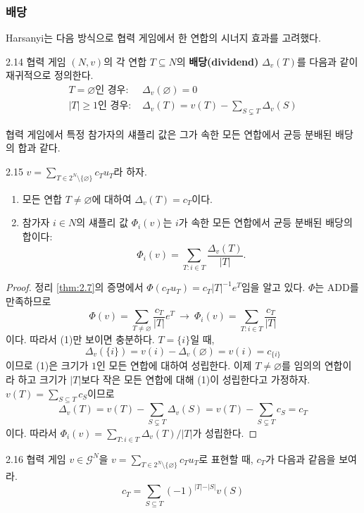 \documentclass{article}
\numberwithin{equation}{section}
\begin{document}
\subsubsection*{배당}
Harsanyi는 다음 방식으로 협력 게임에서 한 연합의 시너지 효과를 고려했다.

\begin{dfn}{}{2.14}
	 협력 게임 $(N,v)$의 각 연합 $T\subseteq N$의 \textbf{배당(dividend)} $\Delta_v(T)$를 다음과 같이 재귀적으로 정의한다.
	\[
		\begin{aligned}
			T=\varnothing\text{인 경우: }&\Delta_v(\varnothing)=0\\
			\vert T\vert\geq1\text{인 경우: }&\Delta_v(T)=v(T)-\sum_{S\subsetneq T}\Delta_v(S)
		\end{aligned}
	\]
\end{dfn}

협력 게임에서 특정 참가자의 섀플리 값은 그가 속한 모든 연합에서 균등 분배된 배당의 합과 같다.

\begin{thm}{}{2.15}
	$v=\sum_{T\in 2^N\setminus\{\varnothing\}}c_Tu_T$라 하자.
	\begin{enumerate}[(1)]
		\item 모든 연합 $T\ne\varnothing$에 대하여 $\Delta_v(T)=c_T$이다.
		\item 참가자 $i\in N$의 섀플리 값 $\Phi_i(v)$는 $i$가 속한 모든 연합에서 균등 분배된 배당의 합이다:
			\[
				\Phi_i(v)=\sum_{T:i\in T}\frac{\Delta_v(T)}{\vert T\vert}.
			\]
	\end{enumerate}
\end{thm}

\begin{proof}
	정리 \ref{thm:2.7}의 증명에서 $\Phi(c_Tu_T)=c_T\vert T\vert^{-1}e^T$임을 알고 있다. $\Phi$는 ADD를 만족하므로
	\[
		\Phi(v)=\sum_{T\ne\varnothing}\frac{c_T}{\vert T\vert}e^T~\longrightarrow~\Phi_i(v)=\sum_{T:i\in T}\frac{c_T}{\vert T\vert}
	\]
	이다. 따라서 (1)만 보이면 충분하다. $T=\{i\}$일 때,
	\[
		\Delta_v(\{i\})=v(i)-\Delta_v(\varnothing)=v(i)=c_{\{i\}}
	\]
	이므로 (1)은 크기가 $1$인 모든 연합에 대하여 성립한다. 이제 $T\ne\varnothing$를 임의의 연합이라 하고 크기가 $\vert T\vert$보다 작은 모든 연합에 대해 (1)이 성립한다고 가정하자. $v(T)=\sum_{S\subseteq T}c_S$이므로
	\[
		\Delta_v(T)=v(T)-\sum_{S\subsetneq T}\Delta_v(S)=v(T)-\sum_{S\subsetneq T}c_S=c_T
	\]
	이다. 따라서 $\Phi_i(v)=\sum_{T:i\in T}\Delta_v(T)/\vert T\vert$가 성립한다.
\end{proof}

\begin{prob}{}{2.16}
	협력 게임 $v\in\mathcal G^N$을 $v=\sum_{T\in 2^N\setminus\{\varnothing\}}c_Tu_T$로 표현할 때, $c_T$가 다음과 같음을 보여라.
	\[
		c_T=\sum_{S\subseteq T}(-1)^{\vert T\vert-\vert S\vert}v(S)
	\]
\end{prob}
\end{document}
